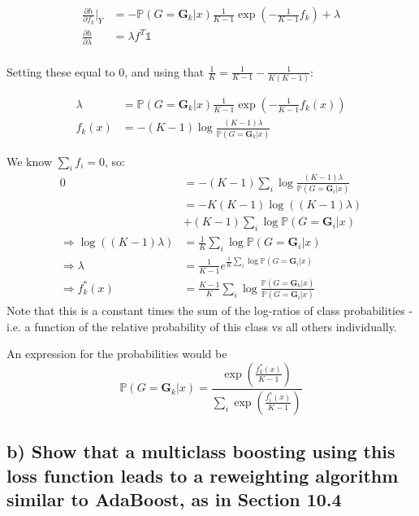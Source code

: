 \begin{align*}
    \frac{\partial h}{\partial f_k}\vert_Y &= -\mathbb{P}(G = \mathbf{G}_k\vert x)\frac{1}{K-1} \exp \left(-\frac{1}{K-1} f_k\right) + \lambda \\
    \frac{\partial h}{\partial \lambda} &= \lambda f^T \mathbb{1}\\
\end{align*}

Setting these equal to $0$, and using that $\frac{1}{K} = \frac{1}{K-1} - \frac{1}{K\left(K-1\right)}$:

\begin{align*}
   \lambda &= \mathbb{P}(G = \mathbf{G}_k\vert x)\frac{1}{K-1} \exp \left(-\frac{1}{K-1} f_k(x) \right) \\
  f_k(x) &= -\left(K-1\right)\log\frac{\left(K-1\right)\lambda}{\mathbb{P}(G = \mathbf{G}_k\vert x)}
\end{align*}

We know $\sum_i f_i = 0$, so:
\begin{align*}
   0 &= -\left(K-1\right) \sum_i \log\frac{\left(K-1\right)\lambda}{\mathbb{P}(G = \mathbf{G}_i\vert x)}\\
    &= -K\left(K-1\right) \log \left(\left(K-1\right)\lambda\right) \\
    &+ \left(K-1\right)\sum_i \log\mathbb{P}(G = \mathbf{G}_i\vert x)\\
   \Rightarrow \log \left(\left(K-1\right)\lambda\right) &= \frac{1}{K}\sum_i \log\mathbb{P}(G = \mathbf{G}_i\vert x)\\
   \Rightarrow \lambda &= \frac{1}{K-1} e^{\frac{1}{K}\sum_i \log\mathbb{P}(G = \mathbf{G}_i\vert x)}\\
   \Rightarrow f^*_k(x) &=  \frac{K-1}{K}\sum_i \log\frac{\mathbb{P}(G = \mathbf{G}_k\vert x)}{\mathbb{P}(G = \mathbf{G}_i\vert x)} 
\end{align*}
Note that this is a constant times the sum of the log-ratios of class probabilities - i.e. a function of the relative probability of this class vs all others individually.

An expression for the probabilities would be
$$ \mathbb{P}(G = \mathbf{G}_k\vert x) = \frac{\exp\left(\frac{f_k^*(x)}{K-1}\right)}{\sum_i \exp\left(\frac{f_i^*(x)}{K-1}\right)}$$

\subsection*{b) Show that a multiclass boosting using this loss function leads to a reweighting algorithm similar to AdaBoost, as in Section 10.4}

